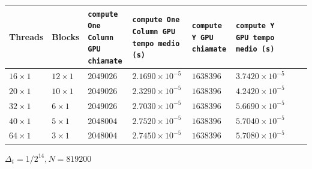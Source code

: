 \begin{table}[h!]
    \centering
    \begin{tabularx}{1\textwidth} { 
      | >{\centering\arraybackslash}X 
      | >{\centering\arraybackslash}X
      | >{\centering\arraybackslash}X
      | >{\centering\arraybackslash}X
      | >{\centering\arraybackslash}X
      | >{\centering\arraybackslash}X
      | >{\centering\arraybackslash}X
      | >{\centering\arraybackslash}X|
    }
    \hline  Threads & Blocks & \texttt{compute One Column GPU chiamate} & \texttt{compute One Column GPU tempo medio (s)} & \texttt{compute Y GPU chiamate} & \texttt{compute Y GPU tempo medio (s)} \\
    \hline $16 \times 1$ & $12 \times 1$ & $2049026$ & $2.1690 \times 10^{-5}$ & $1638396$ & $3.7420 \times 10^{-5}$ \\
    \hline $20 \times 1$ & $10 \times 1$ & $2049026$ & $2.3290 \times 10^{-5}$ & $1638396$ & $4.2420 \times 10^{-5}$ \\
    \hline $32 \times 1$ & $6 \times 1$ & $2049026$ & $2.7030 \times 10^{-5}$ & $1638396$ & $5.6690 \times 10^{-5}$ \\
    \hline $40 \times 1$ & $5 \times 1$ & $2048004$ & $2.7520 \times 10^{-5}$ & $1638396$ & $5.7040 \times 10^{-5}$ \\
    \hline $64 \times 1$ & $3 \times 1$ & $2048004$ & $2.7450 \times 10^{-5}$ & $1638396$ & $5.7080 \times 10^{-5}$ \\
    \hline
    \end{tabularx}
    \label{tab:second_macro_module_time_N_409600}
\end{table}
\vspace{0.2cm}

\newpage
\noindent
\begin{center}
    $\Delta _t = 1 / 2^{14}, N = 819200$ 
\end{center}

